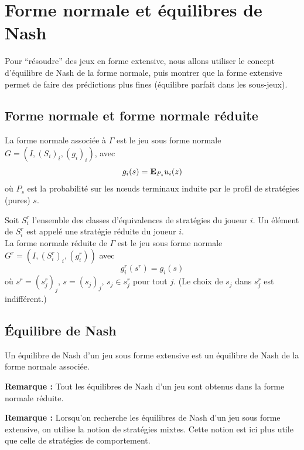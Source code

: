 \section{Forme normale et équilibres de Nash}
Pour ``résoudre'' des jeux en forme extensive, nous allons
utiliser le concept d'équilibre de Nash de la forme normale, puis
montrer que la forme extensive permet de faire des prédictions
plus fines (équilibre parfait dans les sous-jeux).

\subsection{Forme normale et forme normale réduite}
La forme normale associée à
$\Gamma$ est le jeu sous forme normale $G = (I,(S_i)_i,(g_i)_i)$,
avec
$$
g_i(s) = \mathbf{E}_{P_s} u_i(z)
$$
où $P_s$ est la probabilité sur les n{\oe}uds terminaux induite
par le profil de stratégies (pures) $s$.

Soit $S^r_i$ l'ensemble des classes d'équivalences de stratégies
du joueur $i$. Un élément de $S^r_i$ est appelé
une stratégie réduite du joueur $i$.\\
La forme normale réduite de $\Gamma$ est le jeu sous forme normale
$G^r = (I,(S^r_i)_i,(g^r_i))$ avec
$$
g^r_i (s^r)= g_i(s)
$$
où $s^r = (s^r_j)_j$, $s = (s_j)_j$, $s_j\in s^r_j$ pour tout $j$.
(Le choix de $s_j$ dans $s_j^r$ est indifférent.)

\subsection{\'Equilibre de Nash}

\begin{definition}
Un équilibre de Nash d'un jeu sous forme extensive est un
équilibre de Nash de la forme normale associée.
\end{definition}

{\bf Remarque :} Tout les équilibres de Nash d'un jeu sont obtenus
dans la forme normale réduite.

{\bf Remarque :} Lorsqu'on recherche les équilibres de Nash d'un
jeu sous forme extensive, on utilise la notion de stratégies
mixtes. Cette notion est ici plus utile que celle de stratégies de
comportement.

